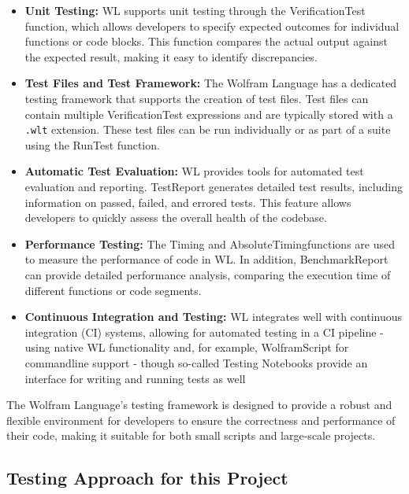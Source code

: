 \begin{itemize}
    \item \textbf{Unit Testing:} WL supports unit testing through the VerificationTest function, which allows developers to specify expected outcomes for individual functions or code blocks. This function compares the actual output against the expected result, making it easy to identify discrepancies.

    \item \textbf{Test Files and Test Framework:} The Wolfram Language has a dedicated testing framework that supports the creation of test files. Test files can contain multiple VerificationTest expressions and are typically stored with a \texttt{.wlt} extension. These test files can be run individually or as part of a suite using the RunTest function.

    \item \textbf{Automatic Test Evaluation:} WL provides tools for automated test evaluation and reporting. TestReport \cite{wolfram_research_inc_testreportwolfram_2024} generates detailed test results, including information on passed, failed, and errored tests. This feature allows developers to quickly assess the overall health of the codebase.

    \item \textbf{Performance Testing:} The Timing and AbsoluteTimingfunctions are used to measure the performance of code in WL. In addition, BenchmarkReport can provide detailed performance analysis, comparing the execution time of different functions or code segments. \cite{wolfram_research_inc_using_2024}

    \item \textbf{Continuous Integration and Testing:} WL integrates well with continuous integration (CI) systems, allowing for automated testing in a CI pipeline - using native WL functionality and, for example, WolframScript \cite{wolfram_research_inc_wolframscriptwolfram_2024} for commandline support - though so-called Testing Notebooks provide an interface for writing and running tests as well \cite{wolfram_research_inc_using_2024-1}
\end{itemize}

The Wolfram Language’s testing framework is designed to provide a robust and flexible environment for developers to ensure the correctness and performance of their code, making it suitable for both small scripts and large-scale projects.

\subsection{Testing Approach for this Project}

